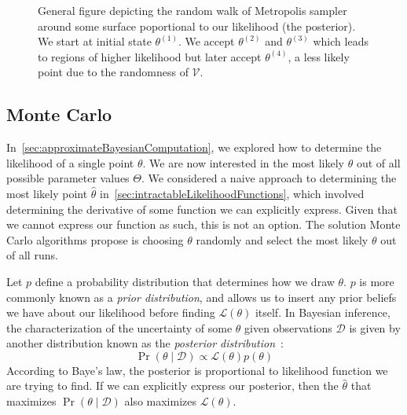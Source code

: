 \begin{figure}[t]
    \centering{}
    \caption{General figure depicting the random walk of Metropolis sampler around some surface poportional to our
    likelihood (the posterior).
    We start at initial state $\theta^{(1)}$.
    We accept $\theta^{(2)}$ and $\theta^{(3)}$ which leads to regions of higher likelihood but later accept
    $\theta^{(4)}$, a less likely point due to the randomness of $\mathcal{V}$.
    }\label{fig:metropolisAlgorithm}
\end{figure}

\subsection{Monte Carlo}\label{subsec:monteCarlo}
In~\autoref{sec:approximateBayesianComputation}, we explored how to determine the likelihood of a single point $\theta$.
We are now interested in the most likely $\theta$ out of all possible parameter values $\Theta$.
We considered a naive approach to determining the most likely point $\hat{\theta}$
in~\autoref{sec:intractableLikelihoodFunctions}, which involved determining the derivative of some function we can
explicitly express.
Given that we cannot express our function as such, this is not an option.
The solution Monte Carlo algorithms propose is choosing $\theta$ randomly and select the most likely $\theta$ out of
all runs.

Let $p$ define a probability distribution that determines how we draw $\theta$.
$p$ is more commonly known as a \emph{prior distribution}, and allows us to insert any prior beliefs we have about our
likelihood before finding $\mathcal{L}(\theta)$ itself.
In Bayesian inference, the characterization of the uncertainty of some $\theta$ given observations $\mathcal{D}$ is
given by another distribution known as the
\emph{posterior distribution}~\cite{lintusaariFundamentalsRecentDevelopments2017}:
\begin{equation}
    \Pr(\theta \mid \mathcal{D}) \propto \mathcal{L}(\theta) p(\theta)
\end{equation}
According to Baye's law, the posterior is proportional to likelihood function we are trying to find.
If we can explicitly express our posterior, then the $\hat{\theta}$ that maximizes $\Pr(\theta \mid \mathcal{D})$ also
maximizes $\mathcal{L}(\theta)$.

